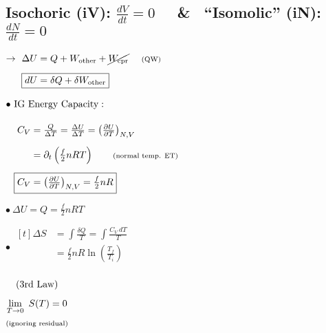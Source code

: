 \documentclass[12pt]{article}
\begin{document}
\noindent
\subsection{Isochoric (iV): \(\boxed{ \tfrac{dV}{dt} = 0 }\)
    \ \ \& \ ``Isomolic'' (iN): \(\boxed{ \tfrac{dN}{dt} = 0 }\)}
\vspace{5pt}\noindent
\begin{minipage}[t]{.49\textwidth}
    \(\rightarrow \ \begin{aligned}[t]
        \Delta U &= Q + W_\text{other} + \cancel{W_\text{cpr}} \ \ \ \ \text{\scriptsize(QW)} \\[5pt]
        \Aboxed{ dU &= \delta Q + \delta W_\text{other}}
    \end{aligned}\)

    \vspace{15pt}
    \(\bullet \ \begin{aligned}[t]
        &\text{IG Energy Capacity}:\\[10pt]
        &\begin{aligned}[t]
            C_V &= \tfrac{Q}{\Delta T} = \tfrac{\Delta U}{\Delta T} 
                = \left( \tfrac{\partial U}{\partial T} \right)_{N,V} \\[5pt]
            &= \partial_t \left( \tfrac{f}{2} nRT \right)
                \hspace{20pt} \text{\scriptsize(normal temp. ET)}\\[5pt]
            \Aboxed{ C_V &= \left( \tfrac{\partial U}{\partial T} \right)_{N,V} = \tfrac{f}{2} nR }
        \end{aligned}
    \end{aligned}\)    
\end{minipage}
\begin{minipage}[t]{.49\textwidth}
    \vspace{1pt}
    \(\bullet \ \boxed{ \Delta U = Q = \tfrac{f}{2} nRT }\)

    \vspace{15pt}
    \(\bullet \ \boxed{ \begin{aligned}[t]
        \Delta S &= \int \frac{\delta Q}{T} = \int \frac{C_V\ dT}{T}\\[5pt]
        &= \tfrac{f}{2} nR \ln{ \left( \frac{T_f}{T_i} \right) }\\[5pt]
    \end{aligned} }\) 
    \hspace{5pt} \begin{minipage}[t]{75pt}
        \(\begin{gathered}[t]
            \text{(3rd Law)}\\[5pt]
            \lim_{T \rightarrow 0}\ S(T) = 0\\
            \text{\scriptsize(ignoring residual)}
        \end{gathered}\)
    \end{minipage} 
\end{minipage}
\end{document}
